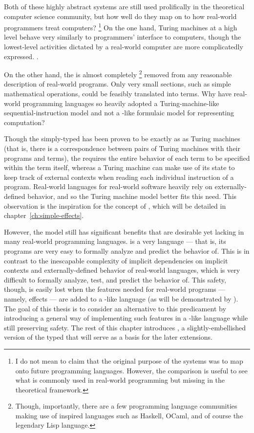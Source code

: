 Both of these highly abstract systems are still used prolifically in the theoretical computer science community, but how well do they map on to how real-world programmers treat computers?%
\footnote{
  I do not mean to claim that the original purpose of the systems was to map onto future programming languages.
  However, the comparison is useful to see what is commonly used in real-world programming but missing in the theoretical framework.
}
On the one hand, Turing machines at a high level behave very similarly to programmers' interface to computers, though the lowest-level activities dictated by a real-world computer are more complicatedly expressed.
\clearpage .

On the other hand, the \lc is almost completely%
\footnote{
  Though, importantly, there are a few programming language communities making use of \lc inspired languages such as Haskell, OCaml, and of course the legendary Lisp language.
}
removed from any reasonable description of real-world programs.
Only very small sections, such as simple mathematical operations, could be feasibly translated into \lc terms.
Why have real-world programming languages so heavily adopted a Turing-machine-like sequential-instruction model and not a \lc-like formulaic model for representing computation?

Though the simply-typed \lc has been proven to be exactly as  as Turing machines (that is, there is a correspondence between pairs of Turing machines with their programs and \lc terms),
the \lc requires the entire behavior of each term to be specified within the term itself,
whereas a Turing machine can make use of its state to keep track of external contexts when reading each individual instruction of a program.
Real-world languages for real-world software heavily rely on externally-defined behavior, and so the Turing machine model better fits this need.
This observation is the inspiration for the concept of , which will be detailed in chapter~\ref{ch:simple-effects}.

However, the \lc model still has significant benefits that are desirable yet lacking in many real-world programming languages.
\lc is a very  language --- that is, its programs are very easy to formally analyze and predict the behavior of.
This is in contrast to the  inescapable complexity of implicit dependencies on implicit contexts and externally-defined behavior of real-world languages, which is very difficult to formally analyze, test, and predict the behavior of.
This safety, though, is easily lost when the features needed for real-world programs --- namely, effects --- are added to a \lc-like language (as will be demonstrated by \LangB).
The goal of this thesis is to consider an alternative to this predicament by introducing a general way of implementing such features in a \lc-like language while still preserving safety.
The rest of this chapter introduces \LangA, a slightly-embellished version of the typed \lc that will serve as a basis for the later extensions.

